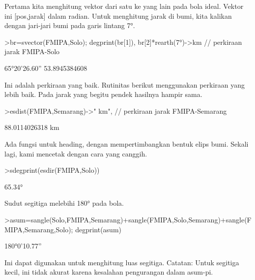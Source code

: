 \documentclass[a4paper,10pt]{article}
\begin{document}
\begin{eulernotebook}
\begin{eulercomment}
\begin{eulercomment}
\begin{eulercomment}
\begin{eulercomment}
\begin{eulercomment}
\begin{eulercomment}
\begin{eulercomment}
\begin{eulercomment}
\begin{eulercomment}
\begin{eulercomment}
\begin{eulercomment}
\begin{eulercomment}
\begin{eulercomment}
\begin{eulercomment}
\begin{eulercomment}
\begin{eulercomment}
\begin{euleroutput}
\end{euleroutput}
\begin{eulercomment}
Pertama kita menghitung vektor dari satu ke yang lain pada bola ideal.
Vektor ini [pos,jarak] dalam radian. Untuk menghitung jarak di bumi,
kita kalikan dengan jari-jari bumi pada garis lintang 7°.
\end{eulercomment}
\begin{eulerprompt}
>br=svector(FMIPA,Solo); degprint(br[1]), br[2]*rearth(7°)->km // perkiraan jarak FMIPA-Solo
\end{eulerprompt}
\begin{euleroutput}
  65°20'26.60''
  53.8945384608
\end{euleroutput}
\begin{eulercomment}
Ini adalah perkiraan yang baik. Rutinitas berikut menggunakan
perkiraan yang lebih baik. Pada jarak yang begitu pendek hasilnya
hampir sama.
\end{eulercomment}
\begin{eulerprompt}
>esdist(FMIPA,Semarang)->" km", // perkiraan jarak FMIPA-Semarang
\end{eulerprompt}
\begin{euleroutput}
  88.0114026318 km
\end{euleroutput}
\begin{eulercomment}
Ada fungsi untuk heading, dengan mempertimbangkan bentuk elips bumi.
Sekali lagi, kami mencetak dengan cara yang canggih.
\end{eulercomment}
\begin{eulerprompt}
>sdegprint(esdir(FMIPA,Solo))
\end{eulerprompt}
\begin{euleroutput}
       65.34°
\end{euleroutput}
\begin{eulercomment}
Sudut segitiga melebihi 180° pada bola.
\end{eulercomment}
\begin{eulerprompt}
>asum=sangle(Solo,FMIPA,Semarang)+sangle(FMIPA,Solo,Semarang)+sangle(FMIPA,Semarang,Solo); degprint(asum)
\end{eulerprompt}
\begin{euleroutput}
  180°0'10.77''
\end{euleroutput}
\begin{eulercomment}
Ini dapat digunakan untuk menghitung luas segitiga. Catatan: Untuk
segitiga kecil, ini tidak akurat karena kesalahan pengurangan dalam
asum-pi.
\end{eulercomment}

\end{eulercomment}
\end{eulercomment}
\end{eulercomment}
\end{eulercomment}
\end{eulercomment}
\end{eulercomment}
\end{eulercomment}
\end{eulercomment}
\end{eulercomment}
\end{eulercomment}
\end{eulercomment}
\end{eulercomment}
\end{eulercomment}
\end{eulercomment}
\end{eulercomment}
\end{eulercomment}
\end{eulernotebook}
\end{document}
